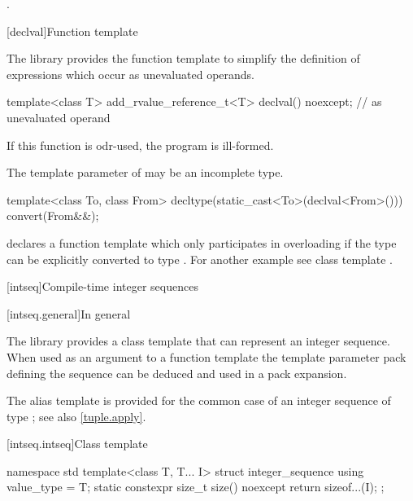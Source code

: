 \begin{itemdescr}
\pnum
\returns {}.
\end{itemdescr}

[declval]{Function template }

\pnum
The library provides the function template  to simplify the definition of
expressions which occur as unevaluated operands.

%
\begin{itemdecl}
template<class T> add_rvalue_reference_t<T> declval() noexcept;    // as unevaluated operand
\end{itemdecl}

\begin{itemdescr}
\pnum
\remarks If this function is odr-used, the program is ill-formed.

\pnum
\remarks The template parameter  of  may be an incomplete type.
\end{itemdescr}

\pnum
\begin{example}
\begin{codeblock}
template<class To, class From> decltype(static_cast<To>(declval<From>())) convert(From&&);
\end{codeblock}
declares a function template  which only participates in overloading if the
type  can be explicitly converted to type . For another example see class
template .
\end{example}

[intseq]{Compile-time integer sequences}

[intseq.general]{In general}

\pnum
The library provides a class template that can represent an integer sequence.
When used as an argument to a function template the template parameter pack defining the
sequence can be deduced and used in a pack expansion.
\begin{note}
The  alias template is provided for the common case of
an integer sequence of type ; see also \ref{tuple.apply}.
\end{note}

[intseq.intseq]{Class template }

%
%
\begin{codeblock}
namespace std {
  template<class T, T... I> struct integer_sequence {
    using value_type = T;
    static constexpr size_t size() noexcept { return sizeof...(I); }
  };
}
\end{codeblock}


